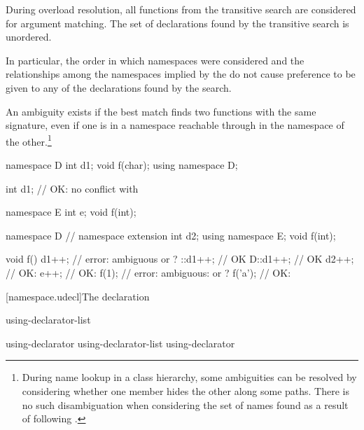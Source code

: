 \pnum
{}%
During overload resolution, all functions from the transitive search are
considered for argument matching. The set of declarations found by the
transitive search is unordered.
\begin{note}
In particular, the order in which namespaces were considered and the
relationships among the namespaces implied by the
 do not cause preference to be given to any
of the declarations found by the search.
\end{note}
An ambiguity exists if the best match finds two functions with the same
signature, even if one is in a namespace reachable through
 in the namespace of the other.\footnote{During
name lookup in a class hierarchy, some ambiguities can be
resolved by considering whether one member hides the other along some
paths. There is no such disambiguation when
considering the set of names found as a result of following
.}
\begin{example}
\begin{codeblock}
namespace D {
  int d1;
  void f(char);
}
using namespace D;

int d1;             // OK: no conflict with 

namespace E {
  int e;
  void f(int);
}

namespace D {       // namespace extension
  int d2;
  using namespace E;
  void f(int);
}

void f() {
  d1++;             // error: ambiguous  or ?
  ::d1++;           // OK
  D::d1++;          // OK
  d2++;             // OK: 
  e++;              // OK: 
  f(1);             // error: ambiguous:  or ?
  f('a');           // OK: 
}
\end{codeblock}
\end{example}
%

[namespace.udecl]{The  declaration}%

\begin{bnf}
\br
     using-declarator-list \terminal{;}
\end{bnf}

\begin{bnf}
\br
    using-declarator \br
    using-declarator-list \terminal{,} using-declarator 
\end{bnf}

